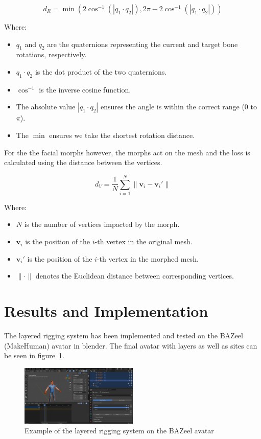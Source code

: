 \documentclass[../../main.tex]{subfiles}
\begin{document}
\[
d_R = \min\left( 2 \cos^{-1}\left( \left| q_1 \cdot q_2 \right| \right), 2\pi - 2 \cos^{-1}\left( \left| q_1 \cdot q_2 \right| \right) \right)
\]

Where:
\begin{itemize}
    \item \( q_1 \) and \( q_2 \) are the quaternions representing the current and target bone rotations, respectively.
    \item \( q_1 \cdot q_2 \) is the dot product of the two quaternions.
    \item \( \cos^{-1} \) is the inverse cosine function.
    \item The absolute value \( | q_1 \cdot q_2 | \) ensures the angle is within the correct range (0 to \( \pi \)).
    \item The \( \min \) ensures we take the shortest rotation distance.
\end{itemize}

For the the facial morphs however, the morphs act on the mesh and the loss is calculated using the distance between the vertices.

\[
d_V = \frac{1}{N} \sum_{i=1}^{N} \| \mathbf{v}_i - \mathbf{v}_i' \|
\]

Where:
\begin{itemize}
    \item \( N \) is the number of vertices impacted by the morph.
    \item \( \mathbf{v}_i \) is the position of the \( i \)-th vertex in the original mesh.
    \item \( \mathbf{v}_i' \) is the position of the \( i \)-th vertex in the morphed mesh.
    \item \( \|\cdot\| \) denotes the Euclidean distance between corresponding vertices.
\end{itemize}

\section{Results and Implementation}
\label{ch:avatar_creation_pose_synthesis:results}

The layered rigging system has been implemented and tested on the BAZeel (MakeHuman) avatar in blender. The final avatar with layers as well as sites can be seen in figure~\ref{fig:layers_example}.

\begin{figure}
    \centering
    \includegraphics[width=0.5\textwidth]{chapters/avatar_creation_pose_synthesis/images/layers_example.png}
    \caption{Example of the layered rigging system on the BAZeel avatar}
    \label{fig:layers_example}
\end{figure}
\end{document}
